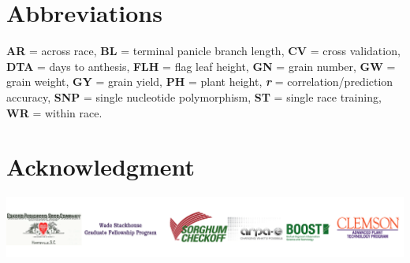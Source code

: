 \documentclass[a0,portrait]{a0poster}
\begin{document}
\begin{minipage}[c]{\linewidth}
\begin{framed}
\begin{multicols}{2}
\section*{Abbreviations}
\fontsize{20}{25} \selectfont 
\textbf{AR} = across race, \textbf{BL} = terminal panicle branch length, \textbf{CV} = cross validation, \textbf{DTA} = days to anthesis, \textbf{FLH} = flag leaf height, \textbf{GN} = grain number, \textbf{GW} = grain weight, \textbf{GY} = grain yield, \textbf{PH} = plant height, \textbf{\textit{r}} = correlation/prediction accuracy, \textbf{SNP} = single nucleotide polymorphism, \textbf{ST} = single race training, \textbf{WR} = within race.
\vspace{-0.5cm}
\section*{Acknowledgment}
\vspace{-0.5cm}
\begin{center}
\includegraphics[trim={0 1cm 0 1cm},clip,width=\linewidth]{figures/funding_sources2}
\end{center}
\end{multicols}
\vspace{-0.5cm}
\end{framed}
\end{minipage}
\end{document}
